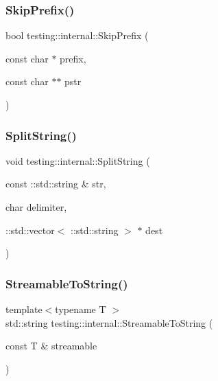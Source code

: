 \mbox{\label{namespacetesting_1_1internal_a244d9a3765727306b597b8992ab84036}} 
\subsubsection{\texorpdfstring{Skip\+Prefix()}{SkipPrefix()}}
{\footnotesize\ttfamily bool testing\+::internal\+::\+Skip\+Prefix (\begin{DoxyParamCaption}\item[{const char $\ast$}]{prefix,  }\item[{const char $\ast$$\ast$}]{pstr }\end{DoxyParamCaption})}

\mbox{\label{namespacetesting_1_1internal_a8eb8eddf760375a490e007b20777ec56}} 
\subsubsection{\texorpdfstring{Split\+String()}{SplitString()}}
{\footnotesize\ttfamily void testing\+::internal\+::\+Split\+String (\begin{DoxyParamCaption}\item[{const \+::std\+::string \&}]{str,  }\item[{char}]{delimiter,  }\item[{\+::std\+::vector$<$ \+::std\+::string $>$ $\ast$}]{dest }\end{DoxyParamCaption})}

\mbox{\label{namespacetesting_1_1internal_aad4beed95d0846e6ffc5da0978ef3bb9}} 
\subsubsection{\texorpdfstring{Streamable\+To\+String()}{StreamableToString()}}
{\footnotesize\ttfamily template$<$typename T $>$ \\
std\+::string testing\+::internal\+::\+Streamable\+To\+String (\begin{DoxyParamCaption}\item[{const T \&}]{streamable }\end{DoxyParamCaption})}

